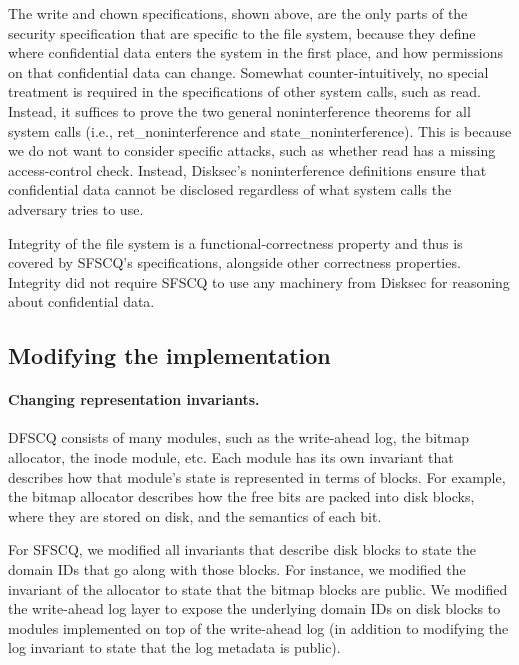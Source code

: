 %  

The {write} and {chown} specifications, shown above, are the only
parts of the security specification that are specific to the file system,
because they define where confidential data enters the system in the
first place, and how permissions on that confidential data can change.
Somewhat counter-intuitively, no special treatment is required in the
specifications of other system calls, such as {read}.  Instead, it suffices to
prove the two general noninterference theorems for all system calls
(i.e., {ret\_noninterference} and {state\_noninterference}).
This is because we do not want to consider specific attacks, such as
whether {read} has a missing access-control check.  Instead, Disksec's
noninterference definitions ensure that confidential data cannot be
disclosed regardless of what system calls the adversary tries to use.

Integrity of the file system is a functional-correctness property
and thus is covered by SFSCQ's specifications, alongside other
correctness properties.
Integrity did not require SFSCQ to use any machinery from Disksec for
reasoning about confidential data.


\subsection{Modifying the implementation}
\label{s:fs:impl}


\paragraph{Changing representation invariants.}

DFSCQ consists of many modules, such as the write-ahead log, the bitmap
allocator, the inode module, etc.  Each module has its own invariant
that describes how that module's state is represented in terms of blocks.
For example, the bitmap allocator describes how the free bits are packed
into disk blocks, where they are stored on disk, and the semantics of
each bit.

For SFSCQ, we modified all invariants that describe disk blocks to
state the domain IDs that go along with those blocks.  For instance,
we modified the invariant of the allocator to state that the bitmap
blocks are public.  We modified the write-ahead log layer to expose the
underlying domain IDs on disk blocks to modules implemented on top of
the write-ahead log (in addition to modifying the log invariant to state
that the log metadata is public).

